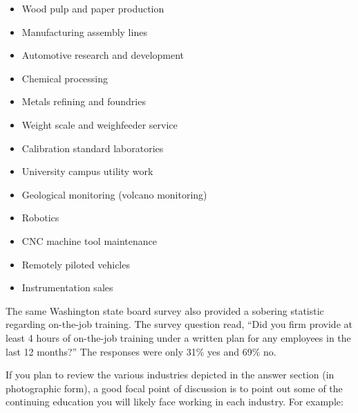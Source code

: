 \begin{itemize}
\item{} Wood pulp and paper production
\item{} Manufacturing assembly lines
\item{} Automotive research and development
\item{} Chemical processing
\item{} Metals refining and foundries
\item{} Weight scale and weighfeeder service
\item{} Calibration standard laboratories
\item{} University campus utility work
\item{} Geological monitoring (volcano monitoring)
\item{} Robotics
\item{} CNC machine tool maintenance
\item{} Remotely piloted vehicles
\item{} Instrumentation sales
\end{itemize}







The same Washington state board survey also provided a sobering statistic regarding on-the-job training.  The survey question read, ``Did you firm provide at least 4 hours of on-the-job training under a written plan for any employees in the last 12 months?''  The responses were only 31\% yes and 69\% no.

\vskip 10pt

If you plan to review the various industries depicted in the answer section (in photographic form), a good focal point of discussion is to point out some of the continuing education you will likely face working in each industry.  For example:

